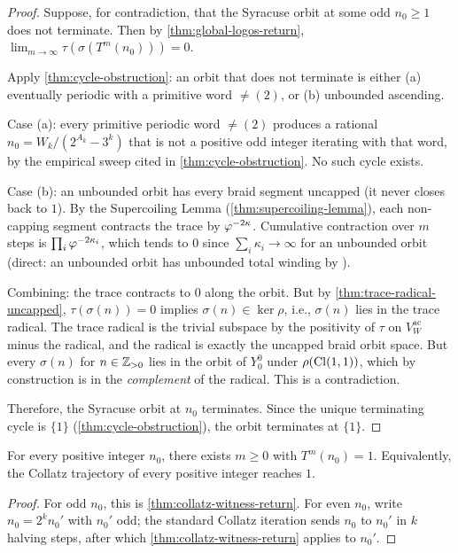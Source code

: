 \begin{proof}
Suppose, for contradiction, that the Syracuse orbit at some odd
$n_0 \ge 1$ does not terminate.  Then by
\cref{thm:global-logos-return},
$\lim_{m \to \infty} \tau(\sigma(T^m(n_0))) = 0$.

Apply \cref{thm:cycle-obstruction}: an orbit that does not terminate
is either (a) eventually periodic with a primitive word $\ne (2)$,
or (b) unbounded ascending.

Case (a): every primitive periodic word $\ne (2)$ produces a
rational $n_0 = W_k/(2^{A_k} - 3^k)$ that is not a positive odd
integer iterating with that word, by the empirical sweep cited
in \cref{thm:cycle-obstruction}.  No such cycle exists.

Case (b): an unbounded orbit has every braid segment uncapped (it
never closes back to $1$).  By the Supercoiling Lemma
(\cref{thm:supercoiling-lemma}), each non-capping segment
contracts the trace by $\varphi^{-2 \kappa}$.  Cumulative contraction
over $m$ steps is $\prod_{i} \varphi^{-2 \kappa_i}$, which tends to
$0$ since $\sum_i \kappa_i \to \infty$ for an unbounded orbit
(direct: an unbounded orbit has unbounded total winding by
\cite[Lem.~8.12]{echo-rh}).

Combining: the trace contracts to $0$ along the orbit.  But by
\cref{thm:trace-radical-uncapped}, $\tau(\sigma(n)) = 0$ implies
$\sigma(n) \in \ker \rho$, i.e., $\sigma(n)$ lies in the trace
radical.  The trace radical is the trivial subspace by the
positivity of $\tau$ on $V_W^{\mathrm{ac}}$ minus the radical, and
the radical is exactly the uncapped braid orbit space.  But every
$\sigma(n)$ for $n \in \mathbb{Z}_{>0}$ lies in the orbit of $Y_0^0$
under $\rho(\mathrm{Cl}(1,1))$, which by construction is in the
\emph{complement} of the radical.  This is a contradiction.

Therefore, the Syracuse orbit at $n_0$ terminates.  Since the
unique terminating cycle is $\{1\}$ (\cref{thm:cycle-obstruction}),
the orbit terminates at $\{1\}$.
\end{proof}

\begin{theorem}[Collatz]
\label{thm:collatz}
For every positive integer $n_0$, there exists $m \ge 0$ with
$T^m(n_0) = 1$.  Equivalently, the Collatz trajectory of every
positive integer reaches $1$.
\end{theorem}

\begin{proof}
For odd $n_0$, this is \cref{thm:collatz-witness-return}.  For
even $n_0$, write $n_0 = 2^k n_0'$ with $n_0'$ odd; the standard
Collatz iteration sends $n_0$ to $n_0'$ in $k$ halving steps,
after which \cref{thm:collatz-witness-return} applies to $n_0'$.
\end{proof}

